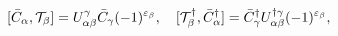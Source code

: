 \begin{equation}\label{5.17}
[\bar{C}_\alpha,{\cal T}_\beta]=
U^\gamma_{\alpha\beta}\bar{C}_\gamma(-1)^{\varepsilon_\beta},\quad
[{\cal T}^\dagger_\beta,\bar{C}^\dagger_\alpha]=
\bar{C}^\dagger_\gamma U^{\dagger\gamma}_{\alpha\beta}
(-1)^{\varepsilon_\beta},
\end{equation}

